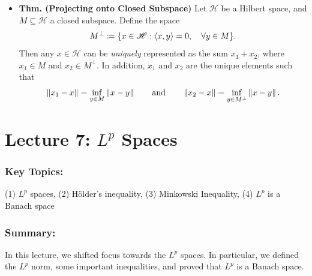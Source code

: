 \documentclass{article}
\begin{document}
\begin{itemize}
\begin{solutions}
\begin{quote}
\begin{equation}
					\end{equation}
				(\textbf{Uniqueness}) Suppose there exist $y_{1}, y_{2} \in M$ so that 
					\begin{equation}
						\norm{x - y_{i}} = \inf_{y \in M}\norm{x - y}. 
					\end{equation}
			\end{quote}
	\end{solutions}
	\item \textbf{Thm. (Projecting onto Closed Subspace)} Let $\mathscr{H}$ be a Hilbert space, and $M \subseteq \mathscr{H}$ a closed subspace. Define the space 
		\begin{equation*}
			M^{\perp} \coloneqq \brac*{x \in \mathscr{H}: \braket{x,y} =0, \quad \forall y \in M}. 
		\end{equation*}	
	Then any $x \in \mathscr{H}$ can be \textit{uniquely} represented as the sum $x_{1} + x_{2}$, where $x_{1} \in M$ and $x_{2} \in M^{\perp}$. In addition, $x_{1}$ and $x_{2}$ are the unique elements such that 
		\begin{equation}
			\left\Vert x_{1} - x \right\Vert = \inf_{y \in M}\left\Vert x - y \right\Vert\qquad \text{and} \qquad \left\Vert x_{2} - x \right\Vert = \inf_{y \in M^{\perp}}\left\Vert x - y \right\Vert. 
		\end{equation}
\end{itemize}
\newpage 
\section{Lecture 7: \texorpdfstring{$L^{p}$}{Lp} Spaces}
\subsubsection{Key Topics:}
(1) $L^{p}$ spaces, (2) H\"older's inequality, (3) Minkowski Inequality, (4) $L^{p}$ is a Banach space
\subsubsection{Summary:}
In this lecture, we shifted focus towards the $L^{p}$ spaces. In particular, we defined the $L^{p}$ norm, some important inequalities, and proved that $L^{p}$ is a Banach space. 
\end{document}
